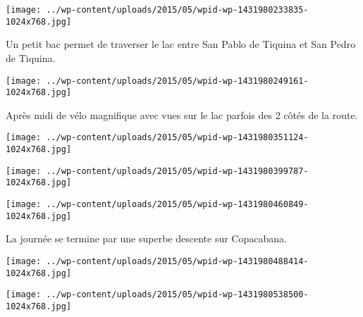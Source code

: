  

 

\begin{center} \texttt{[image: ../wp-content/uploads/2015/05/wpid-wp-1431980233835-1024x768.jpg]} \end{center}

 

 Un petit bac permet de traverser le lac entre San Pablo de Tiquina et San Pedro de Tiquina. 

 

\begin{center} \texttt{[image: ../wp-content/uploads/2015/05/wpid-wp-1431980249161-1024x768.jpg]} \end{center}

 

 Après midi de vélo magnifique avec vues sur le lac parfois des 2 côtés de la route. 

 

\begin{center} \texttt{[image: ../wp-content/uploads/2015/05/wpid-wp-1431980351124-1024x768.jpg]} \end{center}

 

 

\begin{center} \texttt{[image: ../wp-content/uploads/2015/05/wpid-wp-1431980399787-1024x768.jpg]} \end{center}

 

 

\begin{center} \texttt{[image: ../wp-content/uploads/2015/05/wpid-wp-1431980460849-1024x768.jpg]} \end{center}

 

 La journée se termine par une superbe descente sur Copacabana. 

 

\begin{center} \texttt{[image: ../wp-content/uploads/2015/05/wpid-wp-1431980488414-1024x768.jpg]} \end{center}

 

 

\begin{center} \texttt{[image: ../wp-content/uploads/2015/05/wpid-wp-1431980538500-1024x768.jpg]} \end{center}

